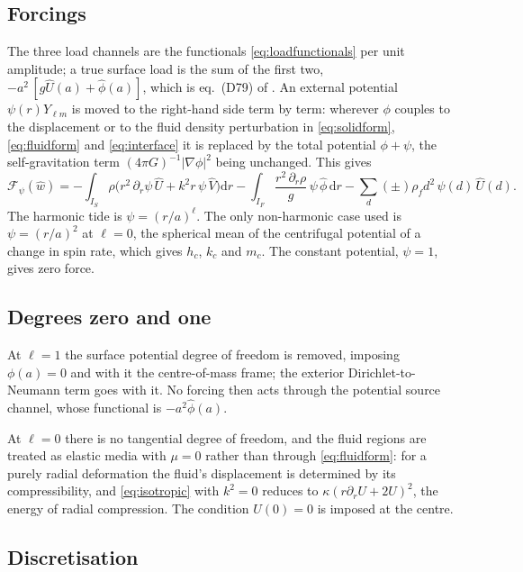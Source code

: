\documentclass[11pt,a4paper]{article}
\newcommand{\dd}{\mathrm{d}}
\newcommand{\grad}{\nabla}
\newcommand{\Ylm}{Y_{\ell m}}
\numberwithin{equation}{section}
\begin{document}
\subsection{Forcings}
\label{sec:forcings}

The three load channels are the functionals \eqref{eq:loadfunctionals} per unit
amplitude; a true surface load is the sum of the first two,
$-a^{2}\,[g\hat U(a)+\hat\phi(a)]$, which is eq.~(D79) of
\citet{AlAttarTromp2014}. An external potential $\psi(r)\Ylm$ is moved to the
right-hand side term by term: wherever $\phi$ couples to the displacement or to
the fluid density perturbation in \eqref{eq:solidform}, \eqref{eq:fluidform}
and \eqref{eq:interface} it is replaced by the total potential $\phi+\psi$, the
self-gravitation term $(4\pi G)^{-1}|\grad\phi|^{2}$ being unchanged. This gives
\begin{equation}
\mathcal{F}_{\psi}(\hat w) =
-\int_{I_{S}}\rho\big(r^{2}\,\partial_{r}\psi\,\hat U + k^{2}r\,\psi\,\hat V\big)\dd r
-\int_{I_{F}}\frac{r^{2}\,\partial_{r}\rho}{g}\,\psi\,\hat\phi\,\dd r
-\sum_{d}(\pm)\rho_{f}d^{2}\,\psi(d)\,\hat U(d).
\label{eq:tideforce}
\end{equation}
The harmonic tide is $\psi=(r/a)^{\ell}$. The only non-harmonic case used is
$\psi=(r/a)^{2}$ at $\ell=0$, the spherical mean of the centrifugal potential
of a change in spin rate, which gives $h_{c}$, $k_{c}$ and $m_{c}$. The
constant potential, $\psi=1$, gives zero force.

\subsection{Degrees zero and one}

At $\ell=1$ the surface potential degree of freedom is removed, imposing
$\phi(a)=0$ and with it the centre-of-mass frame; the exterior Dirichlet-to-Neumann
term goes with it. No forcing then acts through the potential source
channel, whose functional is $-a^{2}\hat\phi(a)$.

At $\ell=0$ there is no tangential degree of freedom, and the fluid regions are
treated as elastic media with $\mu=0$ rather than through
\eqref{eq:fluidform}: for a purely radial deformation the fluid's displacement
is determined by its compressibility, and \eqref{eq:isotropic} with $k^{2}=0$
reduces to $\kappa(r\partial_{r}U+2U)^{2}$, the energy of radial compression.
The condition $U(0)=0$ is imposed at the centre.

\subsection{Discretisation}
\end{document}

